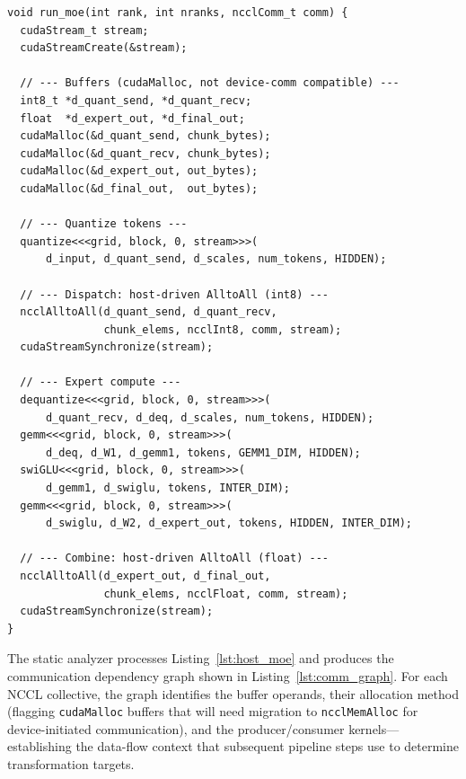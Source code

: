\begin{lstlisting}[style=customc2,caption={Simplified host-driven MoE pipeline (input to the static analyzer).},label={lst:host_moe}]
void run_moe(int rank, int nranks, ncclComm_t comm) {
  cudaStream_t stream;
  cudaStreamCreate(&stream);

  // --- Buffers (cudaMalloc, not device-comm compatible) ---
  int8_t *d_quant_send, *d_quant_recv;
  float  *d_expert_out, *d_final_out;
  cudaMalloc(&d_quant_send, chunk_bytes);
  cudaMalloc(&d_quant_recv, chunk_bytes);
  cudaMalloc(&d_expert_out, out_bytes);
  cudaMalloc(&d_final_out,  out_bytes);

  // --- Quantize tokens ---
  quantize<<<grid, block, 0, stream>>>(
      d_input, d_quant_send, d_scales, num_tokens, HIDDEN);

  // --- Dispatch: host-driven AlltoAll (int8) ---
  ncclAlltoAll(d_quant_send, d_quant_recv,
               chunk_elems, ncclInt8, comm, stream);
  cudaStreamSynchronize(stream);

  // --- Expert compute ---
  dequantize<<<grid, block, 0, stream>>>(
      d_quant_recv, d_deq, d_scales, num_tokens, HIDDEN);
  gemm<<<grid, block, 0, stream>>>(
      d_deq, d_W1, d_gemm1, tokens, GEMM1_DIM, HIDDEN);
  swiGLU<<<grid, block, 0, stream>>>(
      d_gemm1, d_swiglu, tokens, INTER_DIM);
  gemm<<<grid, block, 0, stream>>>(
      d_swiglu, d_W2, d_expert_out, tokens, HIDDEN, INTER_DIM);

  // --- Combine: host-driven AlltoAll (float) ---
  ncclAlltoAll(d_expert_out, d_final_out,
               chunk_elems, ncclFloat, comm, stream);
  cudaStreamSynchronize(stream);
}
\end{lstlisting}

The static analyzer processes Listing~\ref{lst:host_moe} and produces the communication dependency graph shown in Listing~\ref{lst:comm_graph}. For each NCCL collective, the graph identifies the buffer operands, their allocation method (flagging \texttt{cudaMalloc} buffers that will need migration to \texttt{ncclMemAlloc} for device-initiated communication), and the producer/consumer kernels---establishing the data-flow context that subsequent pipeline steps use to determine transformation targets.

